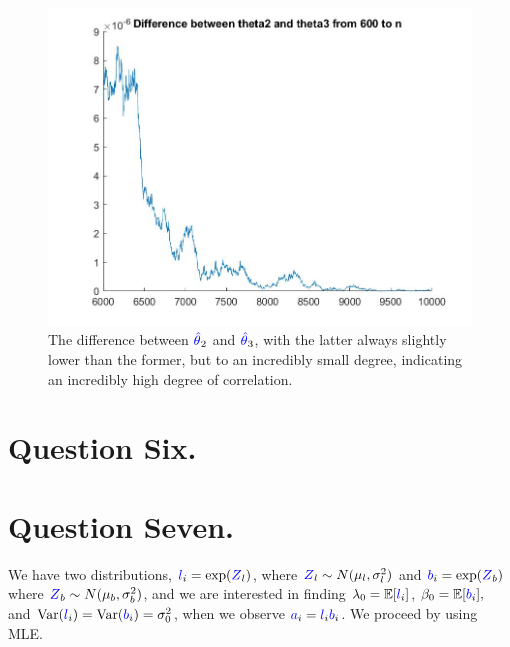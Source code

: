 \documentclass{article}
\renewcommand{\r}[1]{\textcolor{blue}{#1}}
\newcommand{\Var}{\mathrm{Var}}
\newcommand{\E}{\mathbb{E}}
\begin{document}
\begin{figure}[h]
\centering
\includegraphics[width=13cm]{q5partc3.jpeg}
\caption{The difference between $\r{\hat{\theta}}_{2}$ and $\r{\hat{\theta}}_{3}$, with the latter always slightly lower than the former, but to an incredibly small degree, indicating an incredibly high degree of correlation.}
\label{fig:5c3}
\end{figure} 





\section{Question Six.}


\section{Question Seven.}
We have two distributions, $\r{l}_{i}=\exp(\r{Z}_{l})$, where $\r{Z}_{l}\sim N(\mu_{l},\sigma_{l}^{2})$ and $\r{b}_{i}=\exp(\r{Z}_{b})$ where $\r{Z}_{b}\sim N(\mu_{b},\sigma_{b}^{2})$, and we are interested in finding $\lambda_{0}=\E[\r{l}_{i}]$, $\beta_{0}=\E[\r{b}_{i}],$ and $\Var(\r{l}_{i})=\Var(\r{b}_{i})=\sigma_{0}^{2}$, when we observe $\r{a}_{i}=\r{l}_{i}\r{b}_{i}$. We proceed by using MLE.
\end{document}
